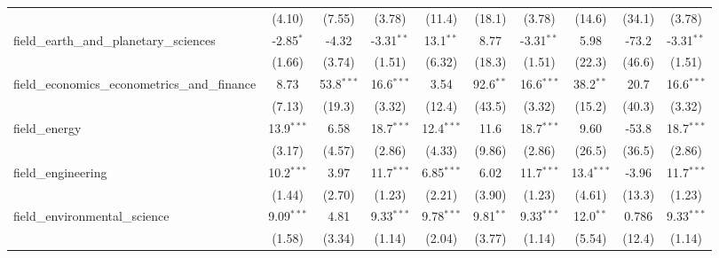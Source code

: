 \begin{tabular}{lccccccccc}
                                                               & (4.10)        & (7.55)        & (3.78)        & (11.4)        & (18.1)         & (3.78)        & (14.6)        & (34.1)         & (3.78)\\   
   field\_earth\_and\_planetary\_sciences                      & -2.85$^{*}$   & -4.32         & -3.31$^{**}$  & 13.1$^{**}$   & 8.77           & -3.31$^{**}$  & 5.98          & -73.2          & -3.31$^{**}$\\   
                                                               & (1.66)        & (3.74)        & (1.51)        & (6.32)        & (18.3)         & (1.51)        & (22.3)        & (46.6)         & (1.51)\\   
   field\_economics\_econometrics\_and\_finance                & 8.73          & 53.8$^{***}$  & 16.6$^{***}$  & 3.54          & 92.6$^{**}$    & 16.6$^{***}$  & 38.2$^{**}$   & 20.7           & 16.6$^{***}$\\   
                                                               & (7.13)        & (19.3)        & (3.32)        & (12.4)        & (43.5)         & (3.32)        & (15.2)        & (40.3)         & (3.32)\\   
   field\_energy                                               & 13.9$^{***}$  & 6.58          & 18.7$^{***}$  & 12.4$^{***}$  & 11.6           & 18.7$^{***}$  & 9.60          & -53.8          & 18.7$^{***}$\\   
                                                               & (3.17)        & (4.57)        & (2.86)        & (4.33)        & (9.86)         & (2.86)        & (26.5)        & (36.5)         & (2.86)\\   
   field\_engineering                                          & 10.2$^{***}$  & 3.97          & 11.7$^{***}$  & 6.85$^{***}$  & 6.02           & 11.7$^{***}$  & 13.4$^{***}$  & -3.96          & 11.7$^{***}$\\   
                                                               & (1.44)        & (2.70)        & (1.23)        & (2.21)        & (3.90)         & (1.23)        & (4.61)        & (13.3)         & (1.23)\\   
   field\_environmental\_science                               & 9.09$^{***}$  & 4.81          & 9.33$^{***}$  & 9.78$^{***}$  & 9.81$^{**}$    & 9.33$^{***}$  & 12.0$^{**}$   & 0.786          & 9.33$^{***}$\\   
                                                               & (1.58)        & (3.34)        & (1.14)        & (2.04)        & (3.77)         & (1.14)        & (5.54)        & (12.4)         & (1.14)\\   

\end{tabular}
